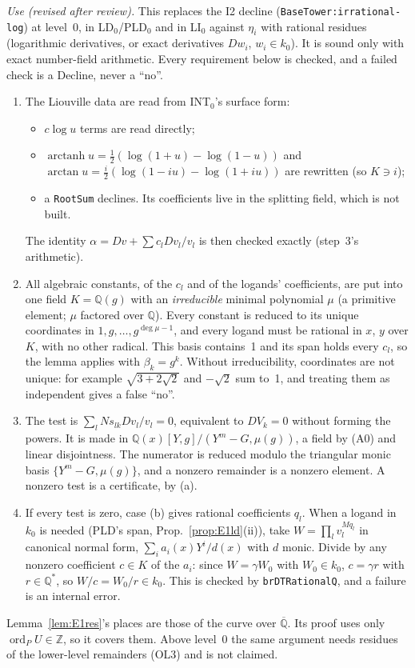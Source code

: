 \documentclass[11pt]{article}
\theoremstyle{definition}
\theoremstyle{remark}
\newcommand{\Q}{\mathbb{Q}}
\newcommand{\Z}{\mathbb{Z}}
\newcommand{\Qbar}{\overline{\mathbb{Q}}}
\newcommand{\code}[1]{\texttt{#1}}
\begin{document}
\noindent \emph{Use (revised after review).} This replaces the I2 decline
(\code{BaseTower:irrational-log}) at level~0, in LD$_0$/PLD$_0$ and in LI$_0$ against
$\eta_i$ with rational residues (logarithmic derivatives, or exact derivatives $Dw_i$, $w_i\in
k_0$). It is sound only with exact number-field arithmetic. Every requirement below is checked,
and a failed check is a Decline, never a ``no''.
\begin{enumerate}
\item The Liouville data are read from INT$_0$'s surface form:
  \begin{itemize}
  \item $c\log u$ terms are read directly;
  \item $\operatorname{arctanh}u=\tfrac12(\log(1+u)-\log(1-u))$ and
    $\arctan u=\tfrac i2(\log(1-iu)-\log(1+iu))$ are rewritten (so $K\ni i$);
  \item a \code{RootSum} declines. Its coefficients live in the splitting field, which is not
    built.
  \end{itemize}
  The identity $\alpha=Dv+\sum c_lDv_l/v_l$ is then checked exactly (step~3's arithmetic).
\item All algebraic constants, of the $c_l$ and of the logands' coefficients, are put into one
  field $K=\Q(g)$ with an \emph{irreducible} minimal polynomial $\mu$ (a primitive element; $\mu$
  factored over $\Q$). Every constant is reduced to its unique coordinates in
  $1,g,\dots,g^{\deg\mu-1}$, and every logand must be rational in $x$, $y$ over $K$, with no other
  radical. This basis contains~1 and its span holds every $c_l$, so the lemma applies with
  $\beta_k=g^k$. Without irreducibility, coordinates are not unique: for example $\sqrt{3+2\sqrt2}$
  and $-\sqrt2$ sum to~1, and treating them as independent gives a false ``no''.
\item The test is $\sum_lNs_{lk}Dv_l/v_l=0$, equivalent to $DV_k=0$ without forming the powers.
  It is made in $\Q(x)[Y,g]/(Y^m-G,\mu(g))$, a field by (A0) and linear disjointness. The
  numerator is reduced modulo the triangular monic basis $\{Y^m-G,\mu(g)\}$, and a nonzero
  remainder is a nonzero element. A nonzero test is a certificate, by (a).
\item If every test is zero, case (b) gives rational coefficients $q_l$. When a logand in $k_0$
  is needed (PLD's span, Prop.~\ref{prop:E1ld}(ii)), take $W=\prod_lv_l^{Mq_l}$ in canonical
  normal form, $\sum_ia_i(x)Y^i/d(x)$ with $d$ monic. Divide by any nonzero coefficient $c\in K$
  of the $a_i$: since $W=\gamma W_0$ with $W_0\in k_0$, $c=\gamma r$ with $r\in\Q^*$, so
  $W/c=W_0/r\in k_0$. This is checked by \code{brDTRationalQ}, and a failure is an internal
  error.
\end{enumerate}
Lemma~\ref{lem:E1res}'s places are those of the curve over $\Qbar$. Its proof uses only
$\operatorname{ord}_PU\in\Z$, so it covers them. Above level~0 the same argument needs residues
of the lower-level remainders (OL3) and is not claimed.
\end{document}
